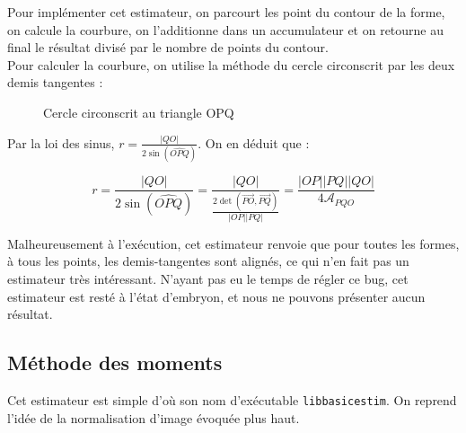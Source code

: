 \documentclass{article}
\theoremstyle{definition}
\begin{document}
	  Pour implémenter cet estimateur, on parcourt les point du contour de la forme, on calcule la courbure, on l'additionne dans un accumulateur et on retourne au final le résultat divisé par le nombre de points du contour. \\
	  
	  Pour calculer la courbure, on utilise la méthode du cercle circonscrit par les deux demis tangentes :
	  
	  \begin{figure}[!h]
	    \centering
	    \caption{Cercle circonscrit au triangle OPQ}
	    \label{cercle-circonscrit}
	  \end{figure}
	  
	  Par la loi des sinus, $r = \frac{|QO|}{2 \sin\left(\widehat{OPQ}\right)}$. On en déduit que :
	  
	  \[ r = \frac{|QO|}{2 \sin\left(\widehat{OPQ}\right)} = \frac{|QO|}{\frac{2 \det\left(\overrightarrow{PO}, \overrightarrow{PQ} \right)}{|OP| |PQ|}} = \frac{|OP| |PQ| |QO|}{4 \mathcal{A}_{PQO}}  \]

	  Malheureusement à l'exécution, cet estimateur renvoie que pour toutes les formes, à tous les points, les demis-tangentes sont alignés, ce qui n'en fait pas un estimateur très intéressant. N'ayant pas eu le temps de régler ce bug, cet estimateur est resté à l'état d'embryon, et nous ne pouvons présenter aucun résultat.
    
    \subsection{Méthode des moments} %
      Cet estimateur est simple d'où son nom d'exécutable \verb-libbasicestim-. On reprend l'idée de la normalisation d'image évoquée plus haut.
      
\end{document}
